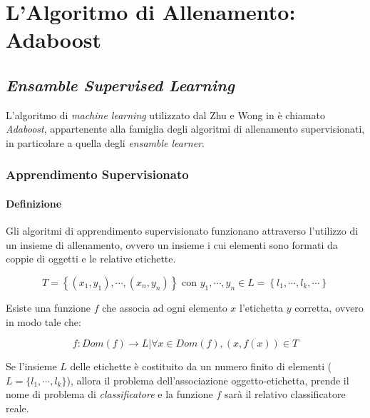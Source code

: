 
\chapter{L'Algoritmo di Allenamento: Adaboost}
\label{chap:adaboost}
    \section{\emph{Ensamble Supervised Learning}}
    \label{sec:supervised_ensamble_learning}
        L'algoritmo di \emph{machine learning} utilizzato dal Zhu e Wong in \cite{Zhu13} è chiamato \emph{Adaboost}, appartenente alla famiglia degli algoritmi di allenamento supervisionati, in particolare a quella degli \emph{ensamble learner}.

        \subsection{Apprendimento Supervisionato}
        \label{sub:supervised_learning}
            \subsubsection{Definizione}
                Gli algoritmi di apprendimento supervisionato funzionano attraverso l'utilizzo di un insieme di allenamento, ovvero un insieme i cui elementi sono formati da coppie di oggetti e le relative etichette.

                \begin{equation}
                    \label{subeq:training_set_labelled}
                    T = \left\{(x_1, y_1), \cdots, (x_n, y_n)\right\} 
                    \text{ con } 
                    y_1, \cdots, y_n \in L = \left\{l_1, \cdots, l_k, \cdots \right\}
                \end{equation}

                Esiste una funzione $f$ che associa ad ogni elemento $x$ l'etichetta $y$ corretta, ovvero in modo tale che:

                \begin{equation}
                    \label{subeq:unknown_function}
                    f:Dom(f) \rightarrow L | \forall x \in Dom(f), (x, f(x)) \in T
                \end{equation}

                Se l'insieme $L$ delle etichette è costituito da un numero finito di elementi ($L = \{l_1, \cdots, l_k\}$), allora il problema dell'associazione oggetto-etichetta, prende il nome di problema di \emph{classificatore} e la funzione $f$ sarà il relativo classificatore reale.
                
